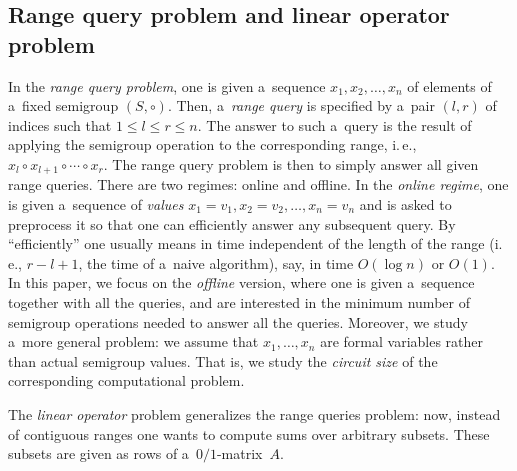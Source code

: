 \documentclass[11pt]{article}
\numberwithin{equation}{section}
\theoremstyle{definition}
\theoremstyle{plain}
\newcommand{\ie}{i.\,e.}
\theoremstyle{plain}\newtheorem{observation}[theorem]{Observation}
\begin{document}
%
%
%

%
%


%
%
\subsection{Range query problem and linear operator problem}
%
%
In the \emph{range query problem},
one is given
a~sequence $x_1, x_2, \dotsc, x_n$ of
elements of a~fixed semigroup $(S, \circ)$.
Then, a~\emph{range query} is
specified by a~pair %
$(l,r)$ of indices  %
such that $1 \le l \le r \le n$.
The answer to such a~query is the result of applying the semigroup
operation to the
corresponding range, \ie, $x_l \circ x_{l+1} \circ \dotsb \circ x_r$.
%
%
The range query problem
is then to simply answer all given range
queries.
There are two
regimes: online and offline. In the \emph{online regime}, one is given
a~sequence of \emph{values}
$x_1=v_1, x_2=v_2, \dotsc, x_n=v_n$ and is asked to preprocess
it %
so that one can   %
%
efficiently answer  %
any subsequent query.
By ``efficiently'' one usually
means in time independent of the length of the range
(\ie, $r-l+1$, the time
of a~naive algorithm), say, in time $O(\log n)$ or $O(1)$.
In this paper, we
focus on the \emph{offline} version, where one is given a~sequence
together with
all the queries, and are interested in the minimum number of
semigroup
operations needed to answer all the queries. Moreover, we study
a~more general
problem: we assume that $x_1, \dotsc, x_n$ are formal variables
rather than
actual semigroup values. That is, we study the \emph{circuit size} of
the corresponding
computational problem.

The \emph{linear operator} problem generalizes the range
queries problem: now, instead of contiguous ranges one wants
to compute sums over arbitrary subsets. These subsets are
given as rows of a~$0/1$-matrix~$A$.  %
\end{document}
